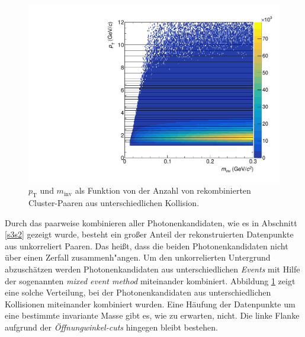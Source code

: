 \begin{figure}[tp]
\centering
\includegraphics[width=.7\linewidth]{hInvMass_pT_Bkg.pdf}
\caption{$p_\text{T}$ und $m_\text{inv}$ als Funktion von der Anzahl von rekombinierten  Cluster-Paaren aus unterschiedlichen Kollision.}
\label{figInvMassPt_b}
\end{figure}
Durch das paarweise kombinieren aller Photonenkandidaten, wie es in Abschnitt \ref{s3s2} gezeigt wurde, besteht ein gro{\ss}er Anteil der rekonstruierten Datenpunkte aus unkorreliert Paaren.
Das hei{\ss}t, dass die beiden Photonenkandidaten nicht \"uber einen Zerfall zusammenh{"a}ngen.
Um den unkorrelierten Untergrund abzusch\"atzen werden Photonenkandidaten aus unterschiedlichen \textit{Events} mit Hilfe der sogenannten \textit{mixed event method} miteinander kombiniert.
Abbildung \ref{figInvMassPt_b} zeigt eine solche Verteilung, bei der Photonenkandidaten aus unterschiedlichen Kollisionen miteinander kombiniert wurden.
Eine H\"aufung der Datenpunkte um eine bestimmte invariante Masse gibt es, wie zu erwarten, nicht.
Die linke Flanke aufgrund der \textit{\"Offnungwinkel-cuts} hingegen bleibt bestehen.
\newline
